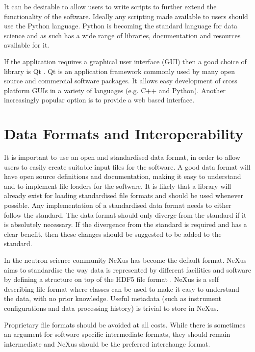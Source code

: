 \documentclass[jnr]{iosart2x}
\begin{document}
\begin{itemzie}
It can be desirable to allow users to write scripts to further extend the functionality of the software.
Ideally any scripting made available to users should use the Python language.
Python is becoming the standard language for data science and as such has a wide range of libraries, documentation and resources available for it.

If the application requires a graphical user interface (GUI) then a good choice of library is Qt \cite{Qt}.
Qt is an application framework commonly used by many open source and commercial software packages.
It allows easy development of cross platform GUIs in a variety of languages (e.g. C++ and Python).
Another increasingly popular option is to provide a web based interface.

\section{Data Formats and Interoperability}
\label{Data Formats and Interoperability}

It is important to use an open and standardised data format, in order to allow users to easily create suitable input files for the software.
A good data format will have open source definitions and documentation, making it easy to understand and to implement file loaders for the software.
It is likely that a library will already exist for loading standardised file formats and should be used whenever possible.
Any implementation of a standardised data format needs to either follow the standard.
The data format should only diverge from the standard if it is absolutely necessary.
If the divergence from the standard is required and has a clear benefit, then these changes should be suggested to be added to the standard.

In the neutron science community NeXus \cite{K_nnecke_2015} has become the default format.
NeXus aims to standardise the way data is represented by different facilities and software by defining a structure on top of the HDF5 file format \cite{HDF5}.
NeXus is a self describing file format where classes can be used to make it easy to understand the data, with no prior knowledge.
Useful metadata (such as instrument configurations and data processing history) is trivial to store in NeXus.

Proprietary file formats should be avoided at all costs.
While there is sometimes an argument for software specific intermediate formats, they should remain intermediate and NeXus should be the preferred interchange format.


\end{itemzie}
\end{document}

